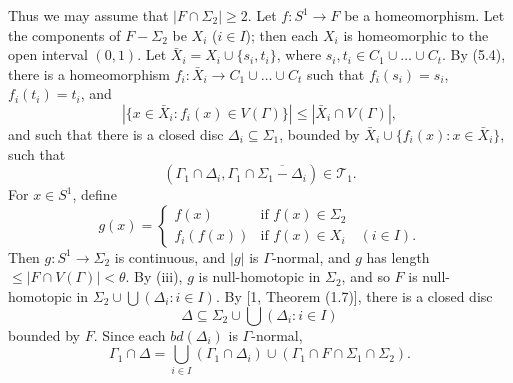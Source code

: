 Thus we may assume that $|F \cap \Sigma_2| \ge 2$. Let $f \colon S^1 \to F$ be a homeomorphism. Let the components of $F - \Sigma_2$ be $X_i$ ($i \in I$); then each $X_i$ is homeomorphic to the open interval $(0, 1)$. Let $\bar{X}_i = X_i \cup \{s_i, t_i\}$, where $s_i, t_i \in C_1 \cup \dots \cup C_t$. By (5.4), there is a homeomorphism $f_i \colon \bar{X}_i \to C_1 \cup \dots \cup C_t$ such that $f_i(s_i) = s_i$, $f_i(t_i) = t_i$, and
\begin{equation*}
|\{x \in \bar{X}_i : f_i(x) \in V(\Gamma)\}| \le |\bar{X}_i \cap V(\Gamma)|,
\end{equation*}
and such that there is a closed disc $\Delta_i \subseteq \Sigma_1$, bounded by $\bar{X}_i \cup \{f_i(x) : x \in \bar{X}_i\}$, such that
\begin{equation*}
(\Gamma_1 \cap \Delta_i, \Gamma_1 \cap \overline{\Sigma_1 - \Delta_i}) \in \mathscr{T}_1.
\end{equation*}
For $x \in S^1$, define
\begin{equation*}
g(x) = \begin{cases} f(x) & \text{if } f(x) \in \Sigma_2 \\ f_i(f(x)) & \text{if } f(x) \in X_i \quad (i \in I). \end{cases}
\end{equation*}
Then $g \colon S^1 \to \Sigma_2$ is continuous, and $|g|$ is $\Gamma$-normal, and $g$ has length $\le |F \cap V(\Gamma)| < \theta$. By (iii), $g$ is null-homotopic in $\Sigma_2$, and so $F$ is null-homotopic in $\Sigma_2 \cup \bigcup (\Delta_i : i \in I)$. By [1, Theorem (1.7)], there is a closed disc
\begin{equation*}
\Delta \subseteq \Sigma_2 \cup \bigcup (\Delta_i : i \in I)
\end{equation*}
bounded by $F$. Since each $bd(\Delta_i)$ is $\Gamma$-normal,
\begin{equation*}
\Gamma_1 \cap \Delta = \bigcup_{i \in I} (\Gamma_1 \cap \Delta_i) \cup (\Gamma_1 \cap F \cap \Sigma_1 \cap \Sigma_2).
\end{equation*}
